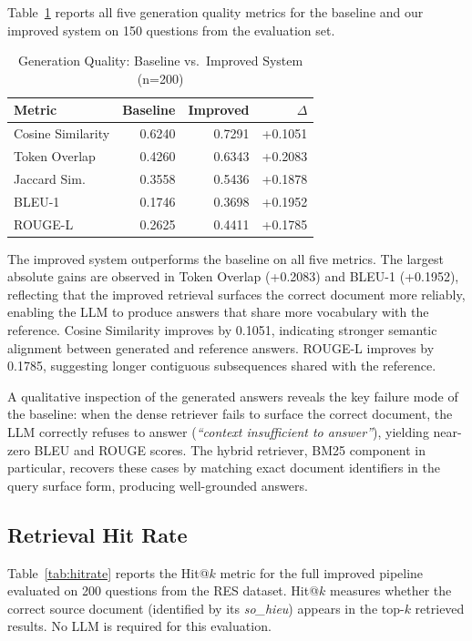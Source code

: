 \documentclass[conference]{IEEEtran}
\begin{document}
Table~\ref{tab:main} reports all five generation quality metrics for the
baseline and our improved system on 150 questions from the evaluation set.

\begin{table}[h]
\caption{Generation Quality: Baseline vs.\ Improved System (n=200)}
\label{tab:main}
\centering
\begin{tabular}{lrrr}
\toprule
\textbf{Metric} & \textbf{Baseline} & \textbf{Improved} & \textbf{$\Delta$} \\
\midrule
Cosine Similarity & 0.6240 & 0.7291 & +0.1051 \\
Token Overlap     & 0.4260 & 0.6343 & +0.2083 \\
Jaccard Sim.      & 0.3558 & 0.5436 & +0.1878 \\
BLEU-1            & 0.1746 & 0.3698 & +0.1952 \\
ROUGE-L           & 0.2625 & 0.4411 & +0.1785 \\
\bottomrule
\end{tabular}
\end{table}

The improved system outperforms the baseline on all five metrics. The largest
absolute gains are observed in Token Overlap (+0.2083) and BLEU-1 (+0.1952),
reflecting that the improved retrieval surfaces the correct document more
reliably, enabling the LLM to produce answers that share more vocabulary with
the reference. Cosine Similarity improves by 0.1051, indicating stronger
semantic alignment between generated and reference answers. ROUGE-L improves
by 0.1785, suggesting longer contiguous subsequences shared with the reference.

A qualitative inspection of the generated answers reveals
the key failure mode of the baseline: when the dense retriever fails to surface
the correct document, the LLM correctly refuses to answer
(\textit{``context insufficient to answer''}),
yielding near-zero BLEU and ROUGE scores. The hybrid retriever, BM25 component
in particular, recovers these cases by matching exact document identifiers in
the query surface form, producing well-grounded answers.

\subsection{Retrieval Hit Rate}

Table~\ref{tab:hitrate} reports the Hit@$k$ metric for the full improved
pipeline evaluated on 200 questions from the RES dataset.
Hit@$k$ measures whether the correct source document (identified by its
\emph{so\_hieu}) appears in the top-$k$ retrieved results.
No LLM is required for this evaluation.
\end{document}
